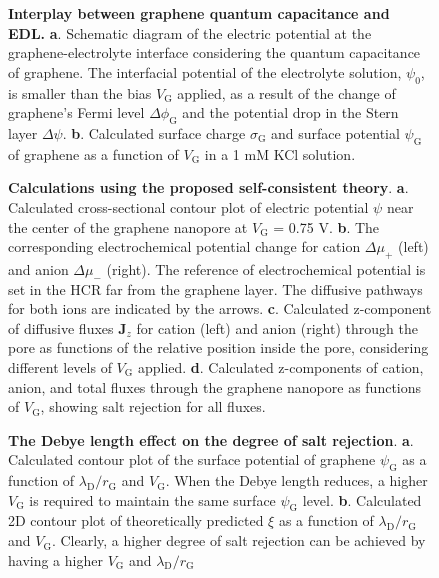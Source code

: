 \begin{figure}[H]
  \centering
  \caption{\textbf{Interplay between graphene quantum capacitance and
      EDL.} \textbf{a}. Schematic diagram of the electric
    potential at the graphene-electrolyte interface considering the
    quantum capacitance of graphene. The interfacial potential of the
    electrolyte solution, $\psi_{0}$, is smaller than the bias
    $V_{\mathrm{G}}$ applied, as a result of the change of graphene's
    Fermi level $\Delta \phi_{\mathrm{G}}$ and the potential drop in
    the Stern layer $\Delta \psi$. \textbf{b}. Calculated surface
    charge $\sigma_{\mathrm{G}}$ and surface potential
    $\psi_{\mathrm{G}}$ of graphene as a function of $V_{\mathrm{G}}$
    in a 1 mM KCl solution. }
  \label{fig:3}
\end{figure}

\begin{figure}[H]
  \centering
  \caption{\textbf{Calculations using the proposed self-consistent
      theory}. \textbf{a}. Calculated cross-sectional contour plot of
    electric potential $\psi$ near the center of the graphene
    nanopore at $V_{\mathrm{G}}$ = 0.75 V. \textbf{b}. The
    corresponding electrochemical potential change for cation
    $\Delta \mu_{+}$ (left) and anion $\Delta \mu_{-}$ (right). The
    reference of electrochemical potential is set in the HCR far from
    the graphene layer. The diffusive pathways for both ions are
    indicated by the arrows. \textbf{c}. Calculated z-component of
    diffusive fluxes $\boldsymbol{J}_{z}$ for cation (left) and anion
    (right) through the pore as functions of the relative position
    inside the pore, considering different levels of $V_{\mathrm{G}}$
    applied. \textbf{d}. Calculated z-components of cation, anion, and
    total fluxes through the graphene nanopore as functions of
    $V_{\mathrm{G}}$, showing salt rejection for all fluxes.}
  \label{fig:4}
\end{figure}

\begin{figure}[H]
  \centering
  \caption{\textbf{The Debye length effect on the degree of salt
      rejection}. \textbf{a}. Calculated contour plot of the surface
    potential of graphene $\psi_{\mathrm{G}}$ as a function of
    $\lambda_{\mathrm{D}}/r_{\mathrm{G}}$ and $V_{\mathrm{G}}$. When
    the Debye length reduces, a higher $V_{\mathrm{G}}$ is required to
    maintain the same surface $\psi_{\mathrm{G}}$
    level. \textbf{b}. Calculated 2D contour plot of theoretically
    predicted $\xi$ as a function of
    $\lambda_{\mathrm{D}}/r_{\mathrm{G}}$ and
    $V_{\mathrm{G}}$. Clearly, a higher degree of salt rejection can
    be achieved by having a higher $V_{\mathrm{G}}$ and
    $\lambda_{\mathrm{D}}/r_{\mathrm{G}}$}
  \label{fig:5}
\end{figure}

